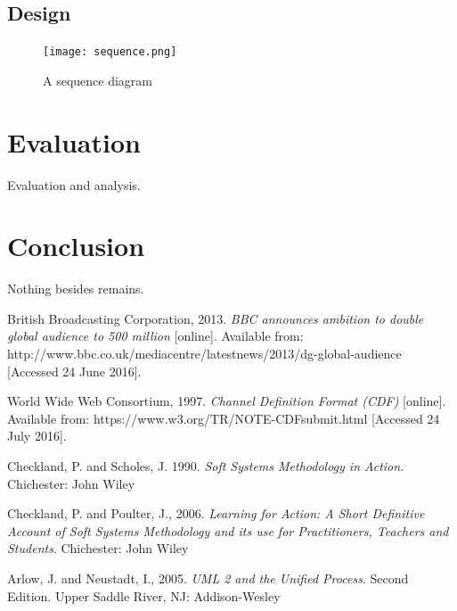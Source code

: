 \documentclass{article}
\begin{document}
\clearpage
\subsection{Design}

\begin{figure}
  \begin{center}
    \texttt{[image: sequence.png]}
  \end{center}
  \label{sequence}
  \caption{A sequence diagram}
\end{figure}

\section{Evaluation}
Evaluation and analysis.


\section{Conclusion}
Nothing besides remains.

\begin{thebibliography}{9}

British Broadcasting Corporation, 2013.
\textit{BBC announces ambition to double global audience to 500 million} [online].
Available from: http://www.bbc.co.uk/mediacentre/latestnews/2013/dg-global-audience [Accessed 24 June 2016].

World Wide Web Consortium, 1997.
\textit{Channel Definition Format (CDF)} [online].
Available from: https://www.w3.org/TR/NOTE-CDFsubmit.html
[Accessed 24 July 2016].

Checkland, P. and Scholes, J. 1990.
\textit{Soft Systems Methodology in Action}.
Chichester: John Wiley

Checkland, P. and Poulter, J., 2006.
\textit{Learning for Action: A Short Definitive Account of Soft Systems Methodology and its use for Practitioners, Teachers and Students}.
Chichester: John Wiley

Arlow, J. and Neustadt, I., 2005.
\textit{UML 2 and the Unified Process}. Second Edition. Upper Saddle River, NJ: Addison-Wesley

\end{thebibliography}
\end{document}
